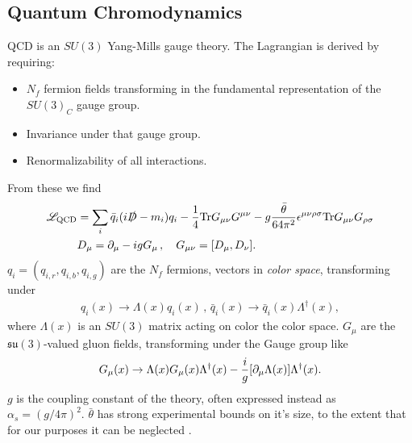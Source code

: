 \subsection{Quantum Chromodynamics}
\label{sec:qcd}

QCD is an $SU(3)$ Yang-Mills gauge theory. The Lagrangian is derived by requiring:
\begin{itemize}
\item
  $N_f$ fermion fields transforming in the fundamental representation of the $SU(3)_C$ gauge group.
\item
  Invariance under that gauge group.
\item
  Renormalizability of all interactions.
\end{itemize}
From these we find \cite{Schwartz:2013pla}
\begin{align}
  \mathscr{L}_{\text{QCD}} &= \sum_i \bar{q}_i (i \slashed{D} - m_i) q_i - {1\over 4} \text{Tr}G_{\mu\nu} G^{\mu\nu} - g{\bar{\theta}\over 64 \pi^2} \epsilon^{\mu\nu\rho\sigma} \text{Tr}G_{\mu\nu} G_{\rho\sigma} \\
  &D_{\mu} = \partial_{\mu} - i g G_{\mu} \,,\quad
  G_{\mu\nu} = [ D_{\mu}, D_{\nu} ].
  \nonumber
\end{align}
$q_i = ( q_{i,r}, q_{i,b}, q_{i,g} )$ are the $N_f$ fermions, vectors in {\it{color space}}, transforming under
\begin{align}
  q_i(x) \to \Lambda(x)q_i(x) \,,\, \bar{q}_i(x) \to \bar{q}_i(x) \Lambda^{\dagger}(x),
  \label{eq:quark_gauge_trans}
\end{align}
where $\Lambda(x)$ is an $SU(3)$ matrix acting on color the color space. $G_{\mu}$ are the $\mathfrak{su}(3)$-valued gluon fields, transforming under the Gauge group like
\begin{align}
  G_{\mu}(x) \to \Lambda(x) G_{\mu}(x) \Lambda^{\dagger}(x) - {i\over g} [ \partial_{\mu} \Lambda(x) ] \Lambda^{\dagger}(x).
  \label{eq:G_gauge_trans}
\end{align}
$g$ is the coupling constant of the theory, often expressed instead as $\alpha_s = (g/4\pi)^2$. $\bar{\theta}$ has strong experimental bounds on it's size, to the extent that for our purposes it can be neglected \cite{ALTAREV1992242}.

